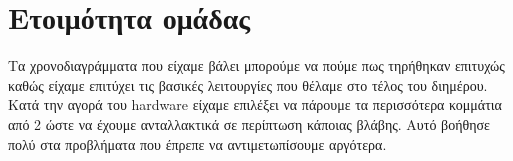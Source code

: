 \section{Ετοιμότητα ομάδας}
Τα χρονοδιαγράμματα που είχαμε βάλει μπορούμε να πούμε πως τηρήθηκαν επιτυχώς καθώς είχαμε επιτύχει τις βασικές λειτουργίες που θέλαμε στο τέλος του διημέρου.
Κατά την αγορά του hardware είχαμε επιλέξει να πάρουμε τα περισσότερα κομμάτια από 2 ώστε να έχουμε ανταλλακτικά σε περίπτωση κάποιας βλάβης.
Αυτό βοήθησε πολύ στα προβλήματα που έπρεπε να αντιμετωπίσουμε αργότερα.
